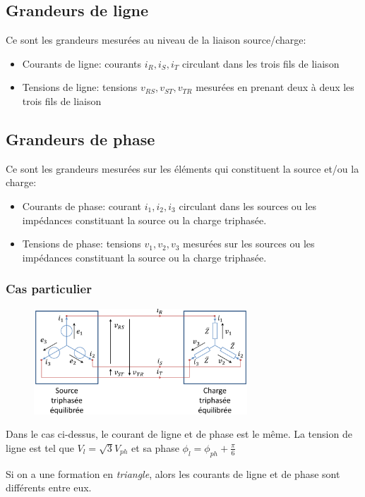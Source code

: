 \documentclass{report}
\begin{document}
\subsection{Grandeurs de ligne}
Ce sont les grandeurs mesurées au niveau de la liaison source/charge:
\begin{itemize}
\item Courants de ligne: courants $i_R, i_S, i_T$ circulant dans les trois fils de liaison
\item Tensions de ligne: tensions $v_{RS}, v_{ST}, v_{TR}$ mesurées en prenant deux à deux les trois fils de liaison 
\end{itemize}

\subsection{Grandeurs de phase}
Ce sont les grandeurs mesurées sur les éléments qui constituent la source et/ou la charge:
\begin{itemize}
\item Courants de phase: courant $i_1, i_2, i_3$ circulant dans les sources ou les impédances constituant la source ou la charge triphasée.
\item Tensions de phase: tensions $v_1, v_2, v_3$ mesurées sur les sources ou les impédances constituant la source ou la charge triphasée.
\end{itemize}

\subsubsection{Cas particulier}
\begin{figure}[H]
\centering
\includegraphics[width=8cm]{img/etoilesetoiles.png}
\end{figure}
Dans le cas ci-dessus, le courant de ligne et de phase est le même. La tension de ligne est tel que $V_l = \sqrt{3}V_{ph}$ et sa phase $\phi_l = \phi_{ph} + \frac{\pi}{6}$\par
Si on a une formation en \textit{triangle}, alors les courants de ligne et de phase sont différents entre eux.
\end{document}
